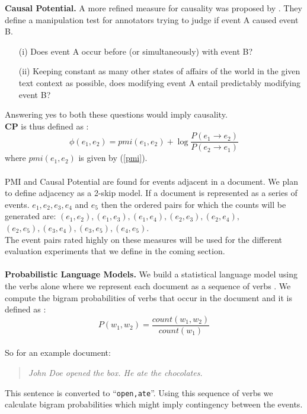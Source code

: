 \documentclass[11pt]{article}
\begin{document}
{\bf Causal Potential.} A more refined measure for causality was proposed by \cite{cp}. They define a manipulation test for annotators trying to judge if event A caused event B. 
\begin{enumerate}
\item[(i)] Does event A occur before (or simultaneously) with event B?
\item[(ii)]  Keeping constant as many other states of affairs of the world in the given text context as possible, does modifying event A entail predictably modifying event B?
\end{enumerate}
Answering yes to both these questions would imply causality.  \\
\textbf{CP} is thus defined as :
\begin{equation}
\phi(e_1,e_2) = pmi(e_1,e_2) + \log\frac{P(e_1 \rightarrow e_2)}{ P(e_2 \rightarrow e_1)} 
\end{equation}
where $pmi(e_1,e_2)$ is given by (\ref{pmi}). \\
\smallskip \\
PMI and Causal Potential are found for events adjacent in a document. We plan to define adjacency as a 2-skip model. If a document is represented as a series of events. $e_1, e_2, e_3, e_4$ and $e_5$ then the ordered pairs for which the counts will be generated are: $(e_1,e_2), (e_1,e_3), (e_1,e_4), (e_2,e_3), (e_2,e_4),$  $(e_2,e_5), (e_3,e_4), (e_3,e_5), (e_4,e_5)$. \\
The event pairs rated highly on these measures will be used for the different evaluation experiments that we define in the coming section. \\
\smallskip \\
{\bf Probabilistic Language Models.}
We build a statistical language model using the verbs alone where we represent each document as a sequence of verbs \cite{manshadi}. 
We compute the bigram probabilities of verbs that occur in the document and it is defined as :
\begin{equation}
P(w_1,w_2) = \frac{count(w_1,w_2)}{count(w_1)}
\end{equation}
\smallskip \\
So for an example document:
\begin{quote}
\textit{John Doe opened the box. He ate the chocolates.}
\end{quote}
 This sentence is converted to “\texttt{open,ate}”. Using this sequence of verbs we calculate bigram probabilities which might imply contingency between the events. \\
\smallskip \\
\end{document}

